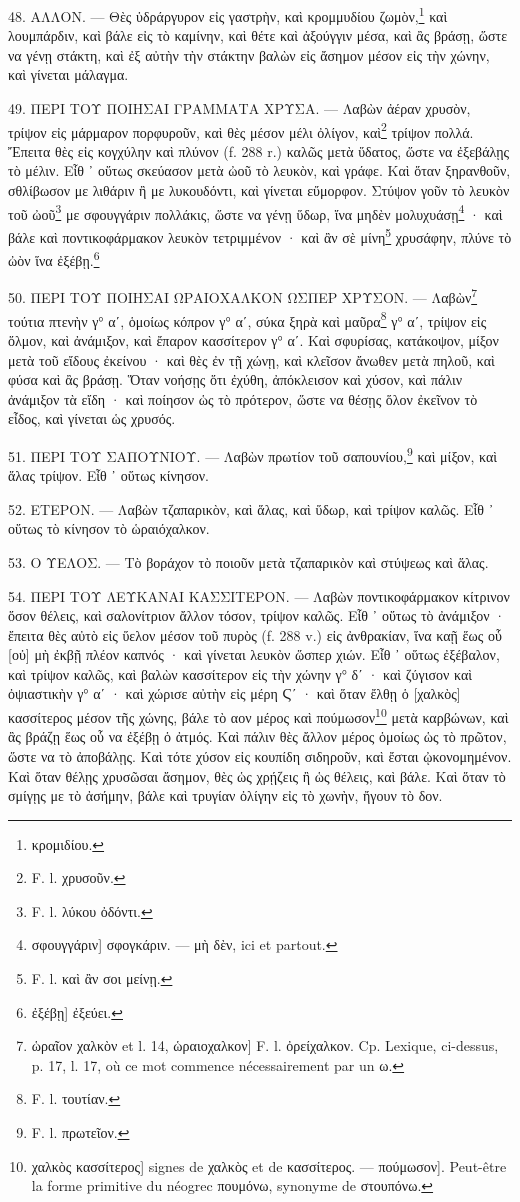 \documentclass[a4paper, 11pt, oneside, polutonikogreek, french]{article}
\begin{document}
48. ΑΛΛΟΝ. --- Θὲς ὑδράργυρον εἰς γαστρὴν, καὶ κρομμυδίου ζωμὸν,\footnote{κρομιδίου.} καὶ λουμπάρδιν, καὶ βάλε εἰς τὸ καμίνην, καὶ θέτε καὶ ἀξούγγιν μέσα, καὶ ἂς βράσῃ, ὥστε να γένῃ στάκτη, καὶ ἐξ αὐτὴν τὴν στάκτην βαλὼν εἰς ἄσημον μέσον εἰς τὴν χώνην, καὶ γίνεται μάλαγμα.

49. ΠΕΡΙ ΤΟΥ ΠΟΙΗΣΑΙ ΓΡΑΜΜΑΤΑ ΧΡΥΣΑ. --- Λαβὼν ἀέραν χρυσὸν, τρίψον εἰς μάρμαρον πορφυροῦν, καὶ θὲς μέσον μέλι ὀλίγον, καὶ\footnote{F. l. χρυσοῦν.} τρίψον πολλά. Ἔπειτα θὲς εἰς κογχύλην καὶ πλύνον (f. 288 r.) καλῶς μετὰ ὕδατος, ὥστε να ἐξεβάλῃς τὸ μέλιν. Εἶθ ᾽ οὕτως σκεύασον μετὰ ὠοῦ τὸ λευκὸν, καὶ γράφε. Καὶ ὅταν ξηρανθοῦν, σθλίβωσον με λιθάριν ἢ με λυκουδόντι, καὶ γίνεται εὔμορφον. Στύψον γοῦν τὸ λευκὸν τοῦ ὠοῦ\footnote{F. l. λύκου ὀδόντι.} με σφουγγάριν πολλάκις, ὥστε να γένῃ ὕδωρ, ἵνα μηδὲν μολυχυάσῃ\footnote{σφουγγάριν] σφογκάριν. --- μὴ δὲν, ici et partout.} · καὶ βάλε καὶ ποντικοφάρμακον λευκὸν τετριμμένον · καὶ ἂν σὲ μίνη\footnote{F. l. καὶ ἂν σοι μείνῃ.} χρυσάφην, πλύνε τὸ ὠὸν ἵνα ἐξέβῃ.\footnote{ἐξέβῃ] ἐξεύει.}

50. ΠΕΡΙ ΤΟΥ ΠΟΙΗΣΑΙ ΩΡΑΙΟΧΑΛΚΟΝ ΩΣΠΕΡ ΧΡΥΣΟΝ. --- Λαβὼν\footnote{ὡραῖον χαλκὸν et l. 14, ὡραιοχαλκον] F. l. ὀρείχαλκον. Cp. Lexique, ci-dessus, p. 17, l. 17, où ce mot commence nécessairement par un ω.} τούτια πτενὴν γ° αʹ, ὁμοίως κόπρον γ° αʹ, σύκα ξηρὰ καὶ μαῦρα\footnote{F. l. τουτίαν.} γ° αʹ, τρίψον εἰς ὅλμον, καὶ ἀνάμιξον, καὶ ἔπαρον κασσίτερον γ° αʹ. Καὶ σφυρίσας, κατάκοψον, μίξον μετὰ τοῦ εἴδους ἐκείνου · καὶ θὲς ἐν τῇ χώνῃ, καὶ κλεῖσον ἄνωθεν μετὰ πηλοῦ, καὶ φύσα καὶ ἂς βράσῃ. Ὅταν νοήσῃς ὅτι ἐχύθη, ἀπόκλεισον καὶ χύσον, καὶ πάλιν ἀνάμιξον τὰ εἴδη · καὶ ποίησον ὡς τὸ πρότερον, ὥστε να θέσῃς ὅλον ἐκεῖνον τὸ εἶδος, καὶ γίνεται ὡς χρυσός.

51. ΠΕΡΙ ΤΟΥ ΣΑΠΟΥΝΙΟΥ. --- Λαβὼν πρωτίον τοῦ σαπουνίου,\footnote{F. l. πρωτεῖον.} καὶ μίξον, καὶ ἅλας τρίψον. Εἶθ ᾽ οὕτως κίνησον.

52. ΕΤΕΡΟΝ. --- Λαβὼν τζαπαρικὸν, καὶ ἅλας, καὶ ὕδωρ, καὶ τρίψον καλῶς. Εἷθ ᾽ οὕτως τὸ κίνησον τὸ ὡραιόχαλκον.

53. Ο ΥΕΛΟΣ. --- Τὸ βοράχον τὸ ποιοῦν μετὰ τζαπαρικὸν καὶ στύψεως καὶ ἅλας.

54. ΠΕΡΙ ΤΟΥ ΛΕΥΚΑΝΑΙ ΚΑΣΣΙΤΕΡΟΝ. --- Λαβὼν ποντικοφάρμακον κίτρινον ὅσον θέλεις, καὶ σαλονίτριον ἄλλον τόσον, τρίψον καλῶς. Εἶθ ᾽ οὕτως τὸ ἀνάμιξον · ἔπειτα θὲς αὐτὸ εἰς ὕελον μέσον τοῦ πυρὸς (f. 288 v.) εἰς ἀνθρακίαν, ἵνα καῇ ἕως οὗ [οὐ] μὴ ἐκβῇ πλέον καπνός · καὶ γίνεται λευκὸν ὥσπερ χιών. Εἶθ ᾽ οὕτως ἐξέβαλον, καὶ τρίψον καλῶς, καὶ βαλὼν κασσίτερον εἰς τὴν χώνην γ° δʹ · καὶ ζύγισον καὶ ὀψιαστικὴν γ° αʹ · καὶ χώρισε αὐτὴν εἰς μέρη Ϛʹ · καὶ ὅταν ἔλθῃ ὁ [χαλκὸς] κασσίτερος μέσον τῆς χώνης, βάλε τὸ αον μέρος καὶ πούμωσον\footnote{χαλκὸς κασσίτερος] signes de χαλκὸς et de κασσίτερος. --- πούμωσον]. Peut-être la forme primitive du néogrec πουμόνω, synonyme de στουπόνω.} μετὰ καρβώνων, καὶ ἂς βράζῃ ἕως οὗ να ἐξέβῃ ὁ ἀτμός. Καὶ πάλιν θὲς ἄλλον μέρος ὁμοίως ὡς τὸ πρῶτον, ὥστε να τὸ ἀποβάλῃς. Καὶ τότε χύσον εἰς κουπίδη σιδηροῦν, καὶ ἔσται ᾠκονομημένον. Καὶ ὅταν θέλῃς χρυσῶσαι ἄσημον, θὲς ὡς χρῄζεις ἢ ὡς θέλεις, καὶ βάλε. Καὶ ὅταν τὸ σμίγῃς με τὸ ἀσήμην, βάλε καὶ τρυγίαν ὀλίγην εἰς τὸ χωνὴν, ἤγουν τὸ δον.
\end{document}
